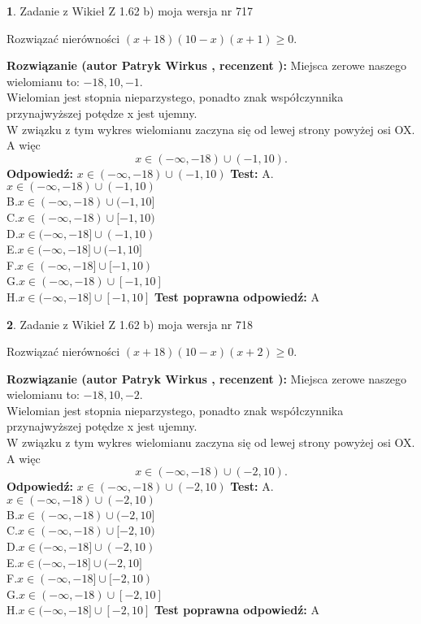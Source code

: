 \documentclass[12pt, a4paper]{article}
\theoremstyle{definition} %
\newtheorem{zad}{}
\newcommand{\zadStart}[1]{\begin{zad}#1\newline}
\newcommand{\zadStop}{\end{zad}}
\newcommand{\rozwStart}[2]{\noindent \textbf{Rozwiązanie (autor #1 , recenzent #2): }\newline}
\newcommand{\rozwStop}{\newline}
\newcommand{\odpStart}{\noindent \textbf{Odpowiedź:}\newline}
\newcommand{\odpStop}{\newline}
\newcommand{\testStart}{\noindent \textbf{Test:}\newline}
\newcommand{\testStop}{\newline}
\newcommand{\kluczStart}{\noindent \textbf{Test poprawna odpowiedź:}\newline}
\newcommand{\kluczStop}{\newline}
\begin{document}
\zadStart{Zadanie z Wikieł Z 1.62 b) moja wersja nr 717}

Rozwiązać nierówności $(x+18)(10-x)(x+1)\ge0$.
\zadStop
\rozwStart{Patryk Wirkus}{}
Miejsca zerowe naszego wielomianu to: $-18, 10, -1$.\\
Wielomian jest stopnia nieparzystego, ponadto znak współczynnika przy\linebreak najwyższej potędze x jest ujemny.\\ W związku z tym wykres wielomianu zaczyna się od lewej strony powyżej osi OX. A więc $$x \in (-\infty,-18) \cup (-1,10).$$
\rozwStop
\odpStart
$x \in (-\infty,-18) \cup (-1,10)$
\odpStop
\testStart
A.$x \in (-\infty,-18) \cup (-1,10)$\\
B.$x \in (-\infty,-18) \cup (-1,10]$\\
C.$x \in (-\infty,-18) \cup [-1,10)$\\
D.$x \in (-\infty,-18] \cup (-1,10)$\\
E.$x \in (-\infty,-18] \cup (-1,10]$\\
F.$x \in (-\infty,-18] \cup [-1,10)$\\
G.$x \in (-\infty,-18) \cup [-1,10]$\\
H.$x \in (-\infty,-18] \cup [-1,10]$
\testStop
\kluczStart
A
\kluczStop



\zadStart{Zadanie z Wikieł Z 1.62 b) moja wersja nr 718}

Rozwiązać nierówności $(x+18)(10-x)(x+2)\ge0$.
\zadStop
\rozwStart{Patryk Wirkus}{}
Miejsca zerowe naszego wielomianu to: $-18, 10, -2$.\\
Wielomian jest stopnia nieparzystego, ponadto znak współczynnika przy\linebreak najwyższej potędze x jest ujemny.\\ W związku z tym wykres wielomianu zaczyna się od lewej strony powyżej osi OX. A więc $$x \in (-\infty,-18) \cup (-2,10).$$
\rozwStop
\odpStart
$x \in (-\infty,-18) \cup (-2,10)$
\odpStop
\testStart
A.$x \in (-\infty,-18) \cup (-2,10)$\\
B.$x \in (-\infty,-18) \cup (-2,10]$\\
C.$x \in (-\infty,-18) \cup [-2,10)$\\
D.$x \in (-\infty,-18] \cup (-2,10)$\\
E.$x \in (-\infty,-18] \cup (-2,10]$\\
F.$x \in (-\infty,-18] \cup [-2,10)$\\
G.$x \in (-\infty,-18) \cup [-2,10]$\\
H.$x \in (-\infty,-18] \cup [-2,10]$
\testStop
\kluczStart
A
\kluczStop
\end{document}
